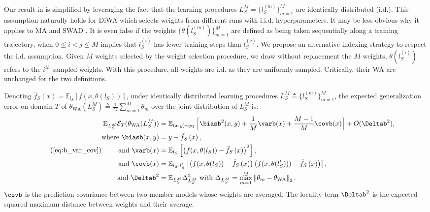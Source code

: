 \begin{remark} \label{remark:identical_assumption}
    Our result in  is simplified by leveraging the fact that the learning procedures $L_S^M=\{l_S^{(m)}\}_{m=1}^M$ are identically distributed (i.d.). This assumption naturally holds for DiWA which selects weights from different runs with i.i.d. hyperparameters.
    It may be less obvious why it applies to MA \cite{arpit2021ensemble} and SWAD \cite{cha2021wad}.
    It is even false if the weights $\{\theta(l_S^{(m)})\}_{m=1}^M$ are defined as being taken sequentially along a training trajectory, \ie when $0\leq i < j \leq M$ implies that $l_S^{(i)}$ has fewer training steps than $l_S^{(j)}$.
    We propose an alternative indexing strategy to respect the i.d. assumption.
    Given $M$ weights selected by the weight selection procedure, we draw without replacement the $M$ weights, \ie $\theta(l_S^{(i)})$ refers to the $i^{th}$ sampled weights.
    With this procedure, all weights are i.d. as they are uniformly sampled.
    Critically, their WA are unchanged for the two definitions.%
\end{remark}
\label{app:proof_bvc}
\begin{proposition*}[\ref{prop:b_var_cov}]
    Denoting $\bar{f}_S\left(x\right) = \mathbb{E}_{l_S} \left[f\left(x,\theta\left(l_S\right)\right)\right]$, under identically distributed learning procedures $L_S^M\triangleq\{l_S^{(m)}\}_{m=1}^M$, the expected generalization error on domain $T$ of $\theta_{\text{WA}}(L_S^M)\triangleq\frac{1}{M} \sum\nolimits_{m=1}^{M} \theta_m$ over the joint distribution of $L_S^M$ is:%
    \begin{equation*}\tag{\ref{eq:b_var_cov}}
        \begin{aligned}
             \mathbb{E}_{L_S^M}\mathcal{E}_T(\theta_{\text{WA}}(L_S^M)) &= \mathbb{E}_{(x,y)\sim p_T}\Big[\biasb^2(x, y)+\frac{1}{M} \varb(x)+\frac{M-1}{M} \covb(x)\Big] + O(\Deltab^2), \\
             \text{where~}\biasb(x,y)&=y-\bar{f}_S\left(x\right), \\
             \text{and~}\varb(x)&=\mathbb{E}_{l_S}\left[\left(f(x, \theta(l_S)) - \bar{f}_S\left(x\right)\right)^{2}\right], \\
             \text{and~}\covb(x)&= \mathbb{E}_{l_S,l_S'}\left[\left(f(x,\theta(l_S))-\bar{f}_S\left(x\right)\right)\left(f(x,\theta(l_S')))-\bar{f}_S\left(x\right)\right)\right], \\
             \text{and~}\Deltab^2&=\mathbb{E}_{L_S^M}\Delta_{L_S^M}^2 \text{~with~} \Delta_{L_S^M}=\max_{m=1}^{M}\left\|\theta_m-\theta_{\text{WA}}\right\|_2.%
        \end{aligned}%
    \end{equation*}%
    $\covb$ is the prediction covariance between two member models whose weights are averaged.
    The locality term $\Deltab^2$ is the expected squared maximum distance between weights and their average.
\end{proposition*}
